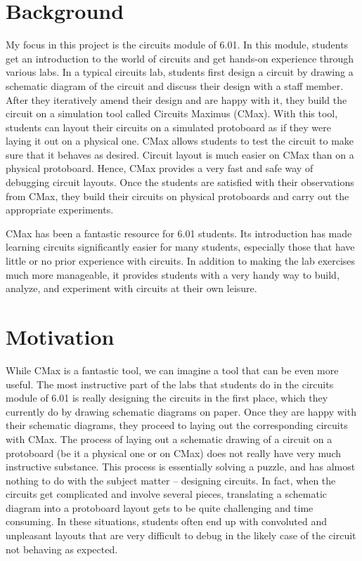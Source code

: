 \documentclass[12pt, doublespacing]{amsart}
\begin{document}
\section{Background}
\label{sec:background}

My focus in this project is the circuits module of 6.01. In this module, students get an introduction to the world of circuits and get hands-on experience through various labs. In a typical circuits lab, students first design a circuit by drawing a schematic diagram of the circuit and discuss their design with a staff member. After they iteratively amend their design and are happy with it, they build the circuit on a simulation tool called Circuits Maximus (CMax)\cite{cmax}. With this tool, students can layout their circuits on a simulated protoboard as if they were laying it out on a physical one. CMax allows students to test the circuit to make sure that it behaves as desired. Circuit layout is much easier on CMax than on a physical protoboard. Hence, CMax provides a very fast and safe way of debugging circuit layouts. Once the students are satisfied with their observations from CMax, they build their circuits on physical protoboards and carry out the appropriate experiments.

CMax has been a fantastic resource for 6.01 students. Its introduction has made learning circuits significantly easier for many students, especially those that have little or no prior experience with circuits. In addition to making the lab exercises much more manageable, it provides students with a very handy way to build, analyze, and experiment with circuits at their own leisure.

\section{Motivation}
\label{sec:motivation}

While CMax is a fantastic tool, we can imagine a tool that can be even more useful. The most instructive part of the labs that students do in the circuits module of 6.01 is really designing the circuits in the first place, which they currently do by drawing schematic diagrams on paper. Once they are happy with their schematic diagrams, they proceed to laying out the corresponding circuits with CMax. The process of laying out a schematic drawing of a circuit on a protoboard (be it a physical one or on CMax) does not really have very much instructive substance. This process is essentially solving a puzzle, and has almost nothing to do with the subject matter -- designing circuits. In fact, when the circuits get complicated and involve several pieces, translating a schematic diagram into a protoboard layout gets to be quite challenging and time consuming. In these situations, students often end up with convoluted and unpleasant layouts that are very difficult to debug in the likely case of the circuit not behaving as expected.
\end{document}
